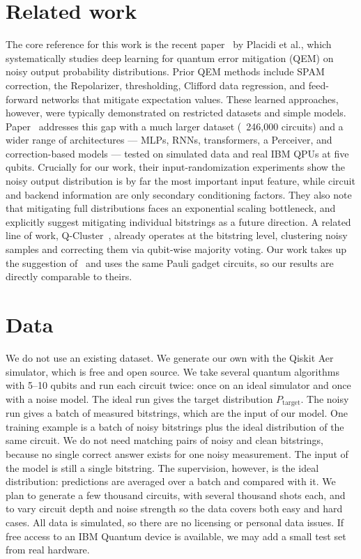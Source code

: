 \documentclass[english]{ucuproposal}
\begin{document}
\section{Related work}
The core reference for this work is the recent paper~\cite{placidi2026qem} by Placidi et al., which systematically studies deep learning for quantum error mitigation (QEM) on noisy output probability distributions. Prior QEM methods include SPAM correction, the Repolarizer, thresholding, Clifford data regression, and feed-forward networks that mitigate expectation values. These learned approaches, however, were typically demonstrated on restricted datasets and simple models. Paper~\cite{placidi2026qem} addresses this gap with a much larger dataset (~{}246,000 circuits) and a wider range of architectures — MLPs, RNNs, transformers, a Perceiver, and correction-based models — tested on simulated data and real IBM QPUs at five qubits. Crucially for our work, their input-randomization experiments show the noisy output distribution is by far the most important input feature, while circuit and backend information are only secondary conditioning factors. They also note that mitigating full distributions faces an exponential scaling bottleneck, and explicitly suggest mitigating individual bitstrings as a future direction. A related line of work, Q-Cluster~\cite{qcluster2025}, already operates at the bitstring level, clustering noisy samples and correcting them via qubit-wise majority voting. Our work takes up the suggestion of~\cite{placidi2026qem} and uses the same Pauli gadget circuits, so our results are directly comparable to theirs.

\section{Data}
We do not use an existing dataset. We generate our own with the Qiskit Aer simulator,
which is free and open source. We take several quantum algorithms with 5--10 qubits and
run each circuit twice: once on an ideal simulator and once with a noise model. The
ideal run gives the target distribution $P_\mathrm{target}$. The noisy run gives a batch
of measured bitstrings, which are the input of our model. One training example is a
batch of noisy bitstrings plus the ideal distribution of the same circuit. We do not need matching pairs of noisy and clean bitstrings, because no single correct
answer exists for one noisy measurement. The input of the model is still a single
bitstring. The supervision, however, is the ideal distribution: predictions are averaged
over a batch and compared with it. We plan to generate a few thousand circuits, with several thousand shots each, and to vary circuit depth and noise strength so the data covers both easy and hard cases. All data is simulated, so there are no licensing or personal data issues. If free access to an IBM Quantum device is available, we may add a small test
set from real hardware.
\end{document}

